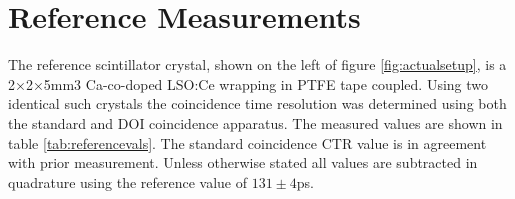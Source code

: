 \section{Reference Measurements}
The reference scintillator crystal, shown on the left of figure \ref{fig:actualsetup}, is a 2×2×5mm3 Ca-co-doped LSO:Ce wrapping in PTFE tape coupled. Using two identical such crystals the coincidence time resolution was determined using both the standard and DOI coincidence apparatus. The measured values are shown in table \ref{tab:referencevals}. The standard coincidence CTR value is in agreement with prior measurement\cite{arron_Meyer_Pauwels_Lecoq_2012}. Unless otherwise stated all values are subtracted in quadrature using the reference value of $131\pm4$ps.